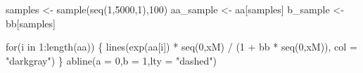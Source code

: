 \documentclass[11pt,]{article}
\newenvironment{Shaded}{}{}
\newcommand{\KeywordTok}[1]{\textcolor[rgb]{0.00,0.00,1.00}{#1}}
\newcommand{\DataTypeTok}[1]{#1}
\newcommand{\DecValTok}[1]{#1}
\newcommand{\StringTok}[1]{\textcolor[rgb]{0.00,0.50,0.50}{#1}}
\newcommand{\ControlFlowTok}[1]{\textcolor[rgb]{0.00,0.00,1.00}{#1}}
\newcommand{\OperatorTok}[1]{#1}
\newcommand{\NormalTok}[1]{#1}
\begin{document}
\begin{Shaded}
\begin{Highlighting}[]
\NormalTok{samples <-}\StringTok{ }\KeywordTok{sample}\NormalTok{(}\KeywordTok{seq}\NormalTok{(}\DecValTok{1}\NormalTok{,}\DecValTok{5000}\NormalTok{,}\DecValTok{1}\NormalTok{),}\DecValTok{100}\NormalTok{)}
\NormalTok{aa_sample <-}\StringTok{ }\NormalTok{aa[samples]}
\NormalTok{b_sample <-}\StringTok{ }\NormalTok{bb[samples]}

\ControlFlowTok{for}\NormalTok{(i }\ControlFlowTok{in} \DecValTok{1}\OperatorTok{:}\KeywordTok{length}\NormalTok{(aa)) \{}
  \KeywordTok{lines}\NormalTok{(}\KeywordTok{exp}\NormalTok{(aa[i]) }\OperatorTok{*}\StringTok{ }\KeywordTok{seq}\NormalTok{(}\DecValTok{0}\NormalTok{,xM) }\OperatorTok{/}\StringTok{ }\NormalTok{(}\DecValTok{1} \OperatorTok{+}\StringTok{ }\NormalTok{bb }\OperatorTok{*}\StringTok{ }\KeywordTok{seq}\NormalTok{(}\DecValTok{0}\NormalTok{,xM)),}
       \DataTypeTok{col =} \StringTok{"darkgray"}\NormalTok{)}
\NormalTok{\}}
\KeywordTok{abline}\NormalTok{(}\DataTypeTok{a =} \DecValTok{0}\NormalTok{,}\DataTypeTok{b =} \DecValTok{1}\NormalTok{,}\DataTypeTok{lty =} \StringTok{"dashed"}\NormalTok{)}


\end{Highlighting}
\end{Shaded}
\end{document}
